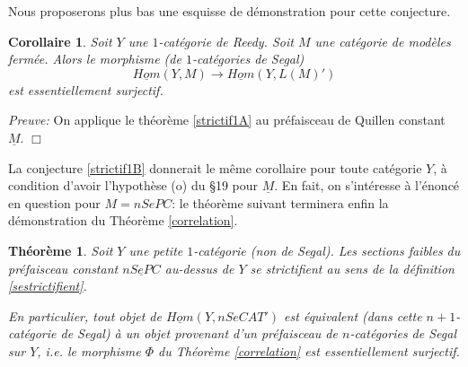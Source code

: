 \documentclass[12pt]{article}
\newcommand{\eop}{\hfill $\Box$\vspace{.1in}}
\newtheorem{theoreme}[lemma]{Th\'eor\`eme}
\newtheorem{corollaire}[lemma]{Corollaire}
\begin{document}
Nous proposerons plus bas une esquisse de d\'emonstration pour cette
conjecture.


\begin{corollaire}
\label{strictif2A}
Soit $Y$ une $1$-cat\'egorie de Reedy.
Soit $M$ une cat\'egorie de mod\`eles ferm\'ee.
Alors le morphisme (de $1$-cat\'egories de Segal)
$$
\underline{Hom} (Y,M)\rightarrow \underline{Hom}(Y,L(M)')
$$
est essentiellement surjectif.
\end{corollaire}
{\em Preuve:} On applique le th\'eor\`eme \ref{strictif1A} au pr\'efaisceau de
Quillen constant $\underline{M}$.
\eop

La conjecture \ref{strictif1B} donnerait le m\^eme corollaire pour toute
cat\'egorie $Y$, \`a condition d'avoir l'hypoth\`ese (o) du \S 19 pour
$\underline{M}$.
En fait, on s'int\'eresse \`a l'\'enonc\'e en question pour $M=nSePC$: le
th\'eor\`eme suivant terminera enfin la d\'emonstration du Th\'eor\`eme
\ref{correlation}.

\begin{theoreme}
\label{strictif3}
Soit $Y$ une petite $1$-cat\'egorie (non de Segal). Les sections faibles du
pr\'efaisceau constant  $\underline{nSePC}$ au-dessus de $Y$ se strictifient
au sens de la d\'efinition \ref{sestrictifient}.

En particulier, tout
objet de $\underline{Hom}(Y, nSeCAT')$ est \'equivalent (dans cette
$n+1$-cat\'egorie de Segal) \`a un objet provenant d'un pr\'efaisceau de
$n$-cat\'egories de Segal sur $Y$, i.e. le morphisme $\Phi$ du Th\'eor\`eme
\ref{correlation} est essentiellement surjectif.
\end{theoreme}
\end{document}
